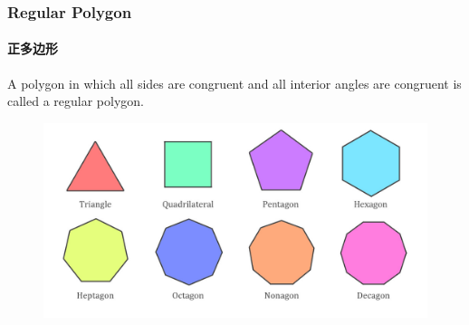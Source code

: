\documentclass[
	11pt, %
]{beamer}
\begin{document}

\begin{frame}
	\frametitle{Regular Polygon} %
	\framesubtitle{正多边形}
	\begin{definition}
		A polygon in which all sides are congruent and all interior angles are
congruent is called a regular polygon.
	\end{definition}
	\begin{figure}
		\includegraphics[width=\linewidth]{Regular_Polygons.jpeg}
	\end{figure}
\end{frame}	

\end{document}
